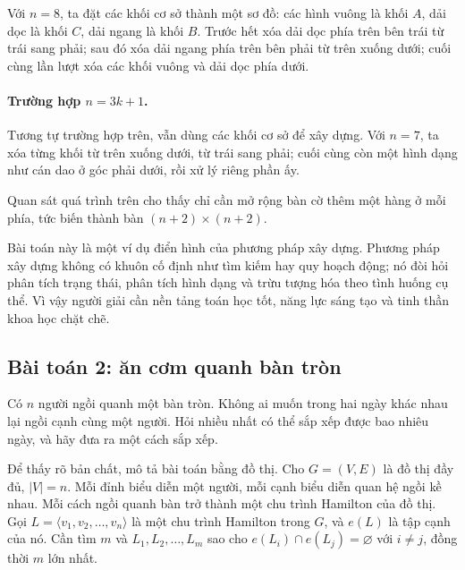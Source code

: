 \documentclass[11pt]{article}
\newcommand{\problem}[1]{\subsection*{#1}}
\begin{document}
Với $n=8$, ta đặt các khối cơ sở thành một sơ đồ: các hình vuông là khối
$A$, dải dọc là khối $C$, dải ngang là khối $B$. Trước hết xóa dải dọc phía
trên bên trái từ trái sang phải; sau đó xóa dải ngang phía trên bên phải từ
trên xuống dưới; cuối cùng lần lượt xóa các khối vuông và dải dọc phía dưới.

\begin{center}
\end{center}

\paragraph{Trường hợp $n=3k+1$.}
Tương tự trường hợp trên, vẫn dùng các khối cơ sở để xây dựng. Với $n=7$, ta
xóa từng khối từ trên xuống dưới, từ trái sang phải; cuối cùng còn một hình
dạng như cán dao ở góc phải dưới, rồi xử lý riêng phần ấy.

Quan sát quá trình trên cho thấy chỉ cần mở rộng bàn cờ thêm một hàng ở mỗi
phía, tức biến thành bàn $(n+2)\times(n+2)$.

Bài toán này là một ví dụ điển hình của phương pháp xây dựng. Phương pháp
xây dựng không có khuôn cố định như tìm kiếm hay quy hoạch động; nó đòi hỏi
phân tích trạng thái, phân tích hình dạng và trừu tượng hóa theo tình huống
cụ thể. Vì vậy người giải cần nền tảng toán học tốt, năng lực sáng tạo và
tinh thần khoa học chặt chẽ.

\problem{Bài toán 2: ăn cơm quanh bàn tròn}

Có $n$ người ngồi quanh một bàn tròn. Không ai muốn trong hai ngày khác nhau
lại ngồi cạnh cùng một người. Hỏi nhiều nhất có thể sắp xếp được bao nhiêu
ngày, và hãy đưa ra một cách sắp xếp.

Để thấy rõ bản chất, mô tả bài toán bằng đồ thị. Cho $G=(V,E)$ là đồ thị đầy
đủ, $|V|=n$. Mỗi đỉnh biểu diễn một người, mỗi cạnh biểu diễn quan hệ ngồi
kề nhau. Mỗi cách ngồi quanh bàn trở thành một chu trình Hamilton của đồ thị.
Gọi $L=\langle v_1,v_2,\ldots,v_n\rangle$ là một chu trình Hamilton trong
$G$, và $e(L)$ là tập cạnh của nó. Cần tìm $m$ và
$L_1,L_2,\ldots,L_m$ sao cho $e(L_i)\cap e(L_j)=\varnothing$ với $i\ne j$,
đồng thời $m$ lớn nhất.
\end{document}
